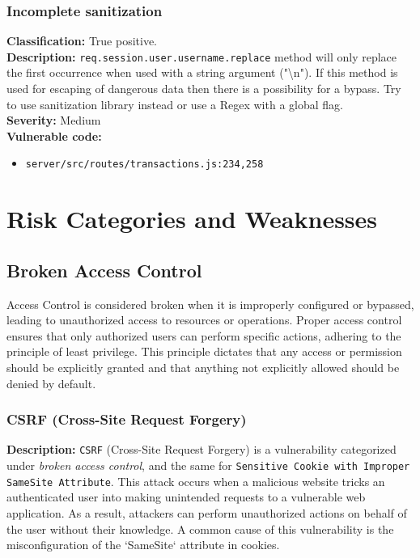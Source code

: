 \documentclass[]{article}
\begin{document}
\subsubsection{Incomplete sanitization}
\textbf{Classification:} {True positive.} \\
\textbf{Description:} \texttt{req.session.user.username.replace} method will only replace the first occurrence when used with a  
          string argument ("\textbackslash n"). If this method is used for escaping of dangerous data then there is a       
          possibility for a bypass. Try to use sanitization library instead or use a Regex with a global flag. \\ 
\textbf{Severity:} Medium \\ 
\textbf{Vulnerable code:}
\begin{itemize}
    \item \texttt{server/src/routes/transactions.js:234,258}
\end{itemize}



\newpage

\section{Risk Categories and Weaknesses}

\subsection{Broken Access Control}

Access Control is considered broken when it is improperly configured or bypassed, leading to unauthorized access to resources or operations. Proper access control ensures that only authorized users can perform specific actions, adhering to the principle of least privilege. This principle dictates that any access or permission should be explicitly granted and that anything not explicitly allowed should be denied by default.

\subsubsection{CSRF (Cross-Site Request Forgery)}
\label{subsubsec:csrf_with_samesite_none_misconfiguration}
\textbf{Description:}  
\texttt{CSRF} (Cross-Site Request Forgery) is a vulnerability categorized under \textit{broken access control}, and the same for \texttt{Sensitive Cookie with Improper SameSite Attribute}. This attack occurs when a malicious website tricks an authenticated user into making unintended requests to a vulnerable web application. As a result, attackers can perform unauthorized actions on behalf of the user without their knowledge. A common cause of this vulnerability is the misconfiguration of the `SameSite` attribute in cookies.
\end{document}
